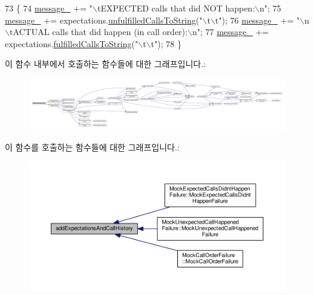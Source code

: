 \begin{DoxyCode}
73 \{
74     \hyperlink{class_test_failure_af95aeab689fdb637c3e94b0c10db3e53}{message\_} += \textcolor{stringliteral}{"\(\backslash\)tEXPECTED calls that did NOT happen:\(\backslash\)n"};
75     \hyperlink{class_test_failure_af95aeab689fdb637c3e94b0c10db3e53}{message\_} += expectations.\hyperlink{class_mock_expected_calls_list_a81cdcb1eb8447b6835fd9c81df9cfa4e}{unfulfilledCallsToString}(\textcolor{stringliteral}{"\(\backslash\)t\(\backslash\)t"});
76     \hyperlink{class_test_failure_af95aeab689fdb637c3e94b0c10db3e53}{message\_} += \textcolor{stringliteral}{"\(\backslash\)n\(\backslash\)tACTUAL calls that did happen (in call order):\(\backslash\)n"};
77     \hyperlink{class_test_failure_af95aeab689fdb637c3e94b0c10db3e53}{message\_} += expectations.\hyperlink{class_mock_expected_calls_list_a66959cff61f39f0857b2523e000c1e8c}{fulfilledCallsToString}(\textcolor{stringliteral}{"\(\backslash\)t\(\backslash\)t"});
78 \}
\end{DoxyCode}


이 함수 내부에서 호출하는 함수들에 대한 그래프입니다.\+:
\nopagebreak
\begin{figure}[H]
\begin{center}
\leavevmode
\includegraphics[width=350pt]{class_mock_failure_a95016259655d22804930338a0223a18e_cgraph}
\end{center}
\end{figure}




이 함수를 호출하는 함수들에 대한 그래프입니다.\+:
\nopagebreak
\begin{figure}[H]
\begin{center}
\leavevmode
\includegraphics[width=350pt]{class_mock_failure_a95016259655d22804930338a0223a18e_icgraph}
\end{center}
\end{figure}


